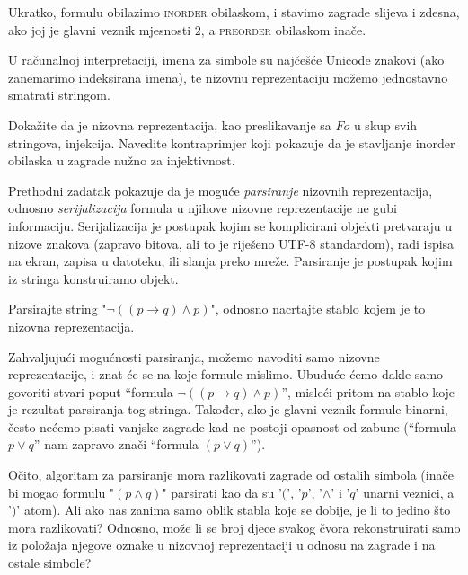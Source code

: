 Ukratko, formulu obilazimo \textsc{inorder} obilaskom, i stavimo zagrade slijeva i zdesna, ako joj je glavni veznik mjesnosti $2$, a \textsc{preorder} obilaskom inače.

U računalnoj interpretaciji, imena za simbole su najčešće Unicode znakovi (ako zanemarimo indeksirana imena), te nizovnu reprezentaciju možemo jednostavno smatrati stringom.

\begin{zadatak}
Dokažite da je nizovna reprezentacija, kao preslikavanje sa $Fo$ u skup svih stringova, injekcija. Navedite kontraprimjer koji pokazuje da je stavljanje inorder obilaska u zagrade nužno za injektivnost.
\end{zadatak}

Prethodni zadatak pokazuje da je moguće \emph{parsiranje} nizovnih reprezentacija, odnosno \emph{serijalizacija} formula u njihove nizovne reprezentacije ne gubi informaciju. Serijalizacija je postupak kojim se komplicirani objekti pretvaraju u nizove znakova (zapravo bitova, ali to je riješeno UTF-8 standardom), radi ispisa na ekran, zapisa u datoteku, ili slanja preko mreže. Parsiranje je postupak kojim iz stringa konstruiramo objekt.

\begin{zadatak}
Parsirajte string "$\neg((p\to q)\wedge p)$", odnosno nacrtajte stablo kojem je to nizovna reprezentacija.
\end{zadatak}

Zahvaljujući mogućnosti parsiranja, možemo navoditi samo nizovne reprezentacije, i znat će se na koje formule mislimo. Ubuduće ćemo dakle samo govoriti stvari poput ``formula $\neg((p\to q)\wedge p)$'', misleći pritom na stablo koje je rezultat parsiranja tog stringa. Također, ako je glavni veznik formule binarni, često nećemo pisati vanjske zagrade kad ne postoji opasnost od zabune (``formula $p\vee q$'' nam zapravo znači ``formula $(p\vee q)$'').

\begin{zadatak}
Očito, algoritam za parsiranje mora razlikovati zagrade od ostalih simbola (inače bi mogao formulu "$(p\wedge q)$" parsirati kao da su '$($', '$p$', '$\wedge$' i '$q$' unarni veznici, a '$)$' atom). Ali ako nas zanima samo oblik stabla koje se dobije, je li to jedino što mora razlikovati? Odnosno, može li se broj djece svakog čvora rekonstruirati samo iz položaja njegove oznake u nizovnoj reprezentaciji u odnosu na zagrade i na ostale simbole?
\end{zadatak}

